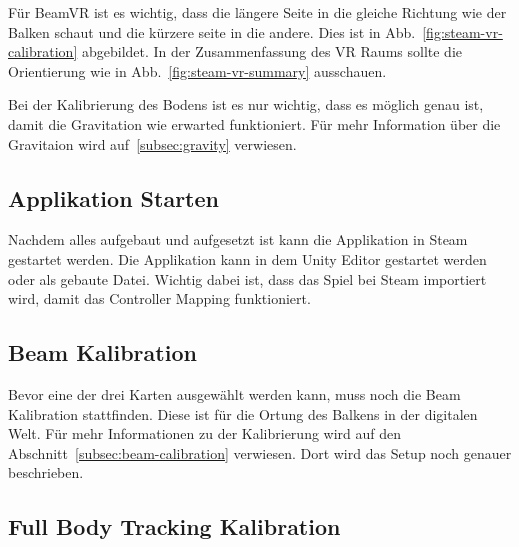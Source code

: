 Für BeamVR ist es wichtig, dass die längere Seite in die gleiche Richtung wie der Balken schaut und die kürzere seite in die andere.
Dies ist in Abb.~\ref{fig:steam-vr-calibration} abgebildet.
In der Zusammenfassung des VR Raums sollte die Orientierung wie in Abb.~\ref{fig:steam-vr-summary} ausschauen.

Bei der Kalibrierung des Bodens ist es nur wichtig, dass es möglich genau ist, damit die Gravitation wie erwarted funktioniert.
Für mehr Information über die Gravitaion wird auf~\ref{subsec:gravity} verwiesen.

\subsection{Applikation Starten}\label{subsec:run-application}

Nachdem alles aufgebaut und aufgesetzt ist kann die Applikation in Steam gestartet werden.
Die Applikation kann in dem Unity Editor gestartet werden oder als gebaute Datei.
Wichtig dabei ist, dass das Spiel bei Steam importiert wird, damit das Controller Mapping funktioniert.

\subsection{Beam Kalibration}

Bevor eine der drei Karten ausgewählt werden kann, muss noch die Beam Kalibration stattfinden.
Diese ist für die Ortung des Balkens in der digitalen Welt.
Für mehr Informationen zu der Kalibrierung wird auf den Abschnitt~\ref{subsec:beam-calibration} verwiesen.
Dort wird das Setup noch genauer beschrieben.

\subsection{Full Body Tracking Kalibration}\label{subsec:full-body-tracking-calibration}

